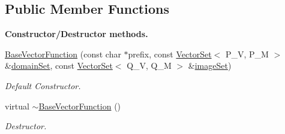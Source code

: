 \subsection*{Public Member Functions}
\begin{Indent}{\bf Constructor/\-Destructor methods.}\par
\begin{DoxyCompactItemize}
\item 
\hyperlink{class_q_u_e_s_o_1_1_base_vector_function_a6f819f1f9adcf13e9ed4a35542aeff20}{Base\-Vector\-Function} (const char $\ast$prefix, const \hyperlink{class_q_u_e_s_o_1_1_vector_set}{Vector\-Set}$<$ P\-\_\-\-V, P\-\_\-\-M $>$ \&\hyperlink{class_q_u_e_s_o_1_1_base_vector_function_af77b709d473f253e5c56aa620d5f3cb0}{domain\-Set}, const \hyperlink{class_q_u_e_s_o_1_1_vector_set}{Vector\-Set}$<$ Q\-\_\-\-V, Q\-\_\-\-M $>$ \&\hyperlink{class_q_u_e_s_o_1_1_base_vector_function_aa3a070a86f7099f53a669f1aab547619}{image\-Set})
\begin{DoxyCompactList}\small\item\em Default Constructor. \end{DoxyCompactList}\item 
virtual \hyperlink{class_q_u_e_s_o_1_1_base_vector_function_a25e2bf49649abce43b9390d7cfd04164}{$\sim$\-Base\-Vector\-Function} ()
\begin{DoxyCompactList}\small\item\em Destructor. \end{DoxyCompactList}\end{DoxyCompactItemize}
\end{Indent}
